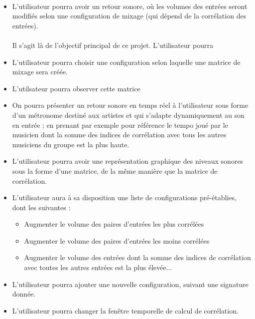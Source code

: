 \documentclass{article}
\begin{document}
    \paragraph{}
    \begin{itemize}
      \item L'utilisateur pourra avoir un retour sonore, où les volumes des
      entrées seront modifiés selon une configuration de mixage (qui
      dépend de la corrélation des entrées).
      \paragraph{}
      Il s'agit là de l'objectif principal de ce projet. L'utilisateur pourra 
      \item L'utilisateur pourra choisir une configuration selon laquelle une
      matrice de mixage sera créée.
      \item L'utilsateur pourra observer cette matrice
      \item On pourra présenter un retour sonore en temps réel à l'utilisateur sous
      forme d'un métronome destiné aux artistes et qui s'adapte dynamiquement au son
      en entrée ; en prenant par exemple pour référence le tempo joué par le musicien
      dont la somme des indices de corrélation avec tous les autres musiciens du groupe
      est la plus haute.
      \item L'utilisateur pourra avoir une représentation graphique des niveaux
      sonores sous la forme d'une matrice, de la même manière que la matrice de
      corrélation.
      \item L'utilisateur aura à sa disposition une liste de configurations
      pré-établies, dont les suivantes :
      \begin{itemize}
        \item Augmenter le volume des paires d'entrées les plus corrélées
        \item Augmenter le volume des paires d'entrées les moins corrélées
        \item Augmenter le volume des entrées dont la somme des indices de
        corrélation avec toutes les autres entrées est la plus élevée...
      \end{itemize}
      \item L'utilisateur pourra ajouter une nouvelle configuration, suivant
      une signature donnée.
      \item L'utilisateur pourra changer la fenêtre temporelle de calcul de
      corrélation.
    \end{itemize}
\end{document}
